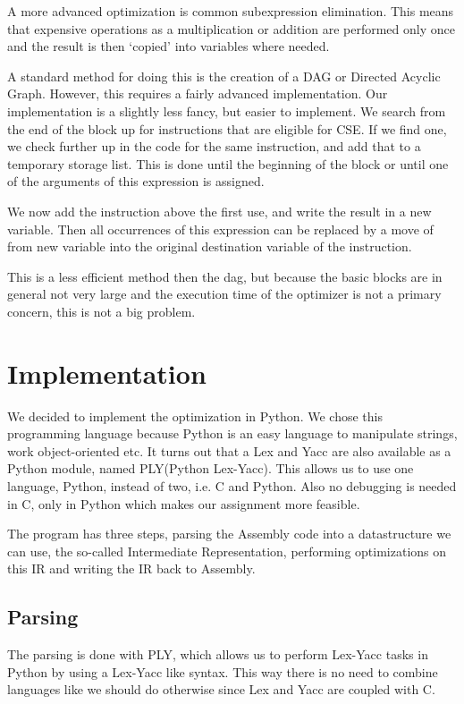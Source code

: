 \documentclass[10pt,a4paper]{article}
\begin{document}
A more advanced optimization is common subexpression elimination. This means
that expensive operations as a multiplication or addition are performed only
once and the result is then `copied' into variables where needed.

A standard method for doing this is the creation of a DAG or Directed Acyclic
Graph. However, this requires a fairly advanced implementation. Our
implementation is a slightly less fancy, but easier to implement.
We search from the end of the block up for instructions that are eligible for
CSE. If we find one, we check further up in the code for the same instruction,
and add that to a temporary storage list. This is done until the beginning of
the block or until one of the arguments of this expression is assigned.

We now add the instruction above the first use, and write the result in a new
variable. Then all occurrences of this expression can be replaced by a move of
from new variable into the original destination variable of the instruction.

This is a less efficient method then the dag, but because the basic blocks are
in general not very large and the execution time of the optimizer is not a
primary concern, this is not a big problem.

\section{Implementation}

We decided to implement the optimization in Python. We chose this programming
language because Python is an easy language to manipulate strings, work
object-oriented etc.
It turns out that a Lex and Yacc are also available as a Python module,
named PLY(Python Lex-Yacc). This allows us to use one language, Python, instead
of two, i.e. C and Python. Also no debugging is needed in C, only in Python
which makes our assignment more feasible.

The program has three steps, parsing the Assembly code into a datastructure we
can use, the so-called Intermediate Representation, performing optimizations on
this IR and writing the IR back to Assembly.

\subsection{Parsing}

The parsing is done with PLY, which allows us to perform Lex-Yacc tasks in
Python by using a Lex-Yacc like syntax. This way there is no need to combine
languages like we should do otherwise since Lex and Yacc are coupled with C.
\end{document}
